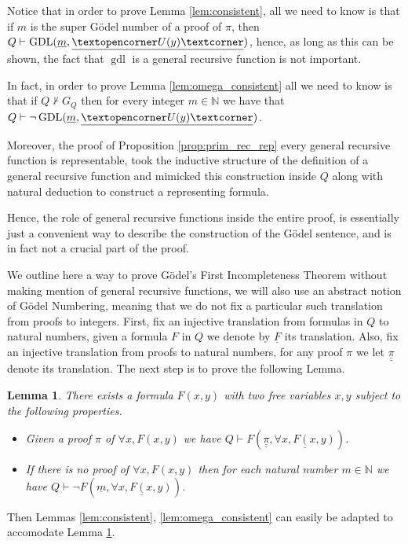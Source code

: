 \documentclass[12pt]{article}
\theoremstyle{plain}
\newtheorem{lemma}[thm]{Lemma}
\theoremstyle{definition}
\newcommand{\bb}[1]{\mathbb{#1}}
\newcommand{\adj}[1]{\text{\textopencorner}{#1}\text{\textcorner}}
\begin{document}
Notice that in order to prove Lemma \ref{lem:consistent}, all we need to know is that if $m$ is the super G\"{o}del number of a proof of $\pi$, then $Q \vdash \operatorname{GDL}(\underline{m},\underline{\adj{U(y)}})$, hence, as long as this can be shown, the fact that $\operatorname{gdl}$ is a general recursive function is not important.

In fact, in order to prove Lemma \ref{lem:omega_consistent} all we need to know is that if $Q \not\vdash G_Q$ then for every integer $m \in \bb{N}$ we have that $Q \vdash \neg \operatorname{GDL}(\underline{m},\underline{\adj{U(y)}})$.

Moreover, the proof of Proposition \ref{prop:prim_rec_rep} every general recursive function is representable, took the inductive structure of the definition of a general recursive function and mimicked this construction inside $Q$ along with natural deduction to construct a representing formula.

Hence, the role of general recursive functions inside the entire proof, is essentially just a convenient way to describe the construction of the G\"{o}del sentence, and is in fact not a crucial part of the proof.

We outline here a way to prove G\"{o}del's First Incompleteness Theorem without making mention of general recursive functions, we will also use an abstract notion of G\"{o}del Numbering, meaning that we do not fix a particular such translation from proofs to integers. First, fix an injective translation from formulas in $Q$ to natural numbers, given a formula $F$ in $Q$ we denote by $\underline{F}$ its translation. Also, fix an injective translation from proofs to natural numbers, for any proof $\pi$ we let $\underline{\underline{\pi}}$ denote its translation. The next step is to prove the following Lemma.

\begin{lemma}\label{lem:existence_Godel}
	There exists a formula $F(x,y)$ with two free variables $x,y$ subject to the following properties.
	\begin{itemize}
		\item Given a proof $\pi$ of $\forall x, F(x,y)$ we have $Q \vdash F(\underline{\underline{\pi}},\underline{\forall x, F(x,y)})$.
		\item If there is no proof of $\forall x, F(x,y)$ then for each natural number $m \in \bb{N}$ we have $Q \vdash \neg F(\underline{m},\underline{\forall x, F(x,y)})$.
	\end{itemize} 
\end{lemma}
Then Lemmas \ref{lem:consistent}, \ref{lem:omega_consistent} can easily be adapted to accomodate Lemma \ref{lem:existence_Godel}.
\end{document}
